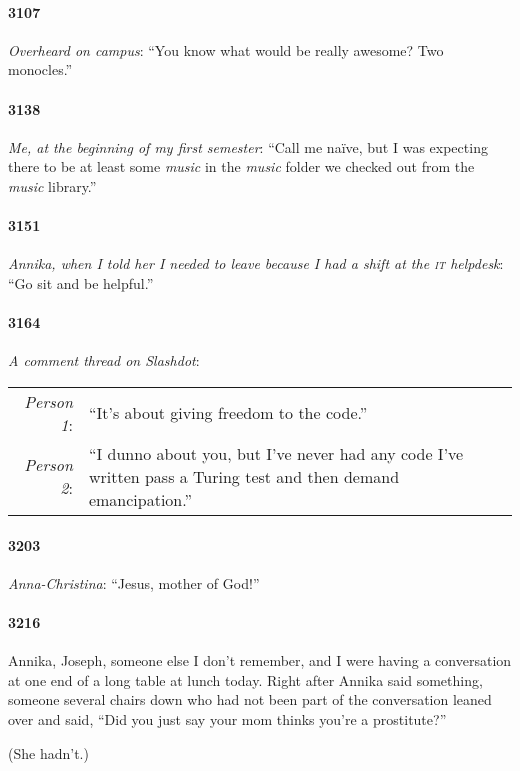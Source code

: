 \documentclass[10pt]{memoir}
\newcommand{\speakertag}[1]{\emph{#1}: }
\newcommand{\st}{\speakertag}
\newcommand{\intro}[1]{\emph{#1}}
\begin{document}
\paragraph{3107} \intro{Overheard on campus}: ``You know what would be really awesome? Two monocles.''

\paragraph{3138} \intro{Me, at the beginning of my first semester}: ``Call me naïve, but I was expecting there to be at least some \emph{music} in the \emph{music} folder we checked out from the \emph{music} library.''

\paragraph{3151} \intro{Annika, when I told her I needed to leave because I had a shift at the \textsc{it} helpdesk}: ``Go sit and be helpful.''

\paragraph{3164} \intro{A comment thread on Slashdot}:\\

\noindent \begin{tabularx}{\textwidth}{r X}
  \st{Person 1} & ``It's about giving freedom to the code.'' \\
  \st{Person 2} & ``I dunno about you, but I've never had any code I've written pass a Turing test and then demand emancipation.''
\end{tabularx}

\paragraph{3203} \intro{Anna-Christina}: ``Jesus, mother of God!''

\paragraph{3216} Annika, Joseph, someone else I don't remember, and I were having a conversation at one end of a long table at lunch today. Right after Annika said something, someone several chairs down who had not been part of the conversation leaned over and said, ``Did you just say your mom thinks you're a prostitute?'' 

(She hadn't.)
\end{document}
